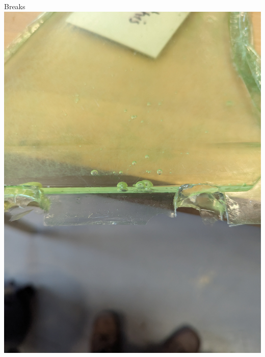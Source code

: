 \begin{frame}{Breaks}
    \includegraphics[height=0.5\textheight,keepaspectratio]{images/sf_root_bubbles.jpg}
\end{frame}

